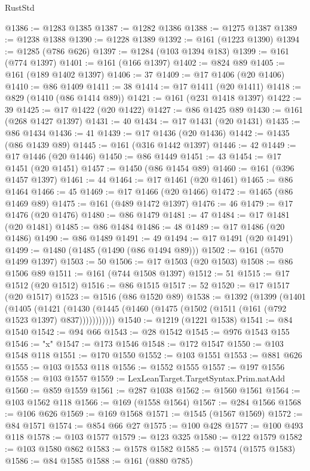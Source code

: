 \begin{lexlean}{RustStd}
\begin{coremodule}
@1386 := @1283 @1385
@1387 := @1282 @1386
@1388 := @1275 @1387
@1389 := @1238 @1388
@1390 := @1228 @1389
@1392 := @161 (@1223 @1390)
@1394 := @1285 (@786 @626)
@1397 := @1284 (@103 @1394 @183)
@1399 := @161 (@774 @1397)
@1401 := @161 (@166 @1397)
@1402 := @824 @89
@1405 := @161 (@189 @1402 @1397)
@1406 := 37
@1409 := @17 @1406 (@20 @1406)
@1410 := @86 @1409
@1411 := 38
@1414 := @17 @1411 (@20 @1411)
@1418 := @829 (@1410 (@86 @1414 @89))
@1421 := @161 (@231 @1418 @1397)
@1422 := 39
@1425 := @17 @1422 (@20 @1422)
@1427 := @86 @1425 @89
@1430 := @161 (@268 @1427 @1397)
@1431 := 40
@1434 := @17 @1431 (@20 @1431)
@1435 := @86 @1434
@1436 := 41
@1439 := @17 @1436 (@20 @1436)
@1442 := @1435 (@86 @1439 @89)
@1445 := @161 (@316 @1442 @1397)
@1446 := 42
@1449 := @17 @1446 (@20 @1446)
@1450 := @86 @1449
@1451 := 43
@1454 := @17 @1451 (@20 @1451)
@1457 := @1450 (@86 @1454 @89)
@1460 := @161 (@396 @1457 @1397)
@1461 := 44
@1464 := @17 @1461 (@20 @1461)
@1465 := @86 @1464
@1466 := 45
@1469 := @17 @1466 (@20 @1466)
@1472 := @1465 (@86 @1469 @89)
@1475 := @161 (@489 @1472 @1397)
@1476 := 46
@1479 := @17 @1476 (@20 @1476)
@1480 := @86 @1479
@1481 := 47
@1484 := @17 @1481 (@20 @1481)
@1485 := @86 @1484
@1486 := 48
@1489 := @17 @1486 (@20 @1486)
@1490 := @86 @1489
@1491 := 49
@1494 := @17 @1491 (@20 @1491)
@1499 := @1480 (@1485 (@1490 (@86 @1494 @89)))
@1502 := @161 (@570 @1499 @1397)
@1503 := 50
@1506 := @17 @1503 (@20 @1503)
@1508 := @86 @1506 @89
@1511 := @161 (@744 @1508 @1397)
@1512 := 51
@1515 := @17 @1512 (@20 @1512)
@1516 := @86 @1515
@1517 := 52
@1520 := @17 @1517 (@20 @1517)
@1523 := @1516 (@86 @1520 @89)
@1538 := @1392
    (@1399
      (@1401
        (@1405
          (@1421 (@1430 (@1445 (@1460 (@1475 (@1502 (@1511 (@161 (@792 @1523 @1397) @837)))))))))))
@1540 := @1219 (@1221 @1538)
@1541 := @84 @1540
@1542 := @94 @66
@1543 := @28 @1542
@1545 := @976 @1543 @155
@1546 := "x"
@1547 := @173 @1546
@1548 := @172 @1547
@1550 := @103 @1548 @118
@1551 := @170 @1550
@1552 := @103 @1551
@1553 := @881 @626
@1555 := @103 @1553 @118
@1556 := @1552 @1555
@1557 := @197 @1556
@1558 := @103 @1557
@1559 := LexLeanTarget.TargetSyntax.Prim.natAdd
@1560 := @859 @1559
@1561 := @287 @1038
@1562 := @1560 @1561
@1564 := @103 @1562 @118
@1566 := @169 (@1558 @1564)
@1567 := @284 @1566
@1568 := @106 @626
@1569 := @169 @1568
@1571 := @1545 (@1567 @1569)
@1572 := @84 @1571
@1574 := @854 @66 @27
@1575 := @100 @428
@1577 := @100 @493 @118
@1578 := @103 @1577
@1579 := @123 @325
@1580 := @122 @1579
@1582 := @103 @1580 @862
@1583 := @1578 @1582
@1585 := @1574 (@1575 @1583)
@1586 := @84 @1585
@1588 := @161 (@880 @785)

\end{coremodule}
\end{lexlean}
